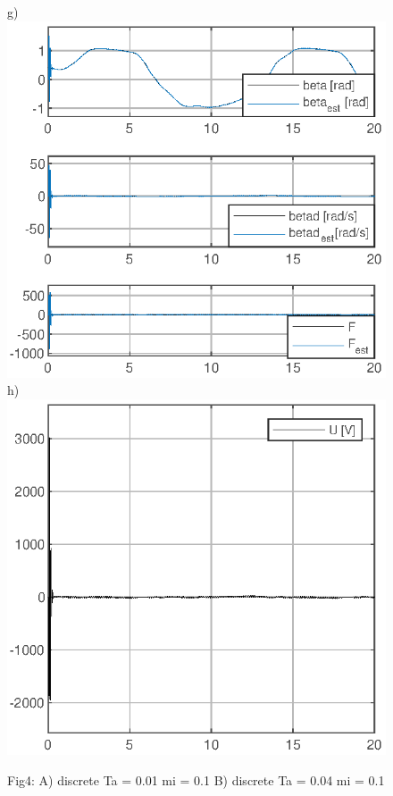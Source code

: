 \documentclass[10pt, a4paper]{article}
\begin{document}
\begin{figure}[ht]
	g) \includegraphics[width=0.22\columnwidth]{ACex6/figs/FIG4_b_tdescrete_sin_Ta0.04/StateVar_tdescrete_sin_Ta0.04} 
	h) \includegraphics[width=0.22\columnwidth]{ACex6/figs/FIG4_b_tdescrete_sin_Ta0.04/U_tdescrete_sin_Ta0.04}
	\caption{Fig4: A) discrete Ta = 0.01 mi = 0.1 B) discrete Ta = 0.04 mi = 0.1}
\end{figure}
\end{document}
